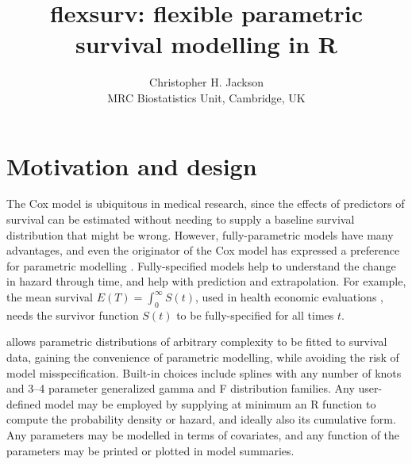 \documentclass[nojss,nofooter]{jss}\usepackage[]{graphicx}\usepackage[]{color}
\author{Christopher H. Jackson \\ MRC Biostatistics Unit, Cambridge, UK \\ \email{chris.jackson@mrc-bsu.cam.ac.uk}}
\title{flexsurv: flexible parametric survival modelling in R}
\begin{document}
\section{Motivation and design}

The Cox model is ubiquitous in medical research, since the effects of
predictors of survival can be estimated without needing to supply a
baseline survival distribution that might be wrong.  However,
fully-parametric models have many advantages, and even the originator
of the Cox model has expressed a preference for parametric modelling
\citep{reid:cox:conversation}.  Fully-specified models help to
understand the change in hazard through time, and help with prediction
and extrapolation. For example, the mean survival $E(T) =
\int_0^{\infty}S(t)$, used in health economic
evaluations \citep{latimer2013survival}, needs the survivor function
$S(t)$ to be fully-specified for all times $t$.


 allows parametric distributions of
arbitrary complexity to be fitted to survival data, gaining the
convenience of parametric modelling, while avoiding the risk of model
misspecification.  Built-in choices include splines with any number of
knots \citep{royston:parmar} and 3--4 parameter generalized gamma and
F distribution families.  Any user-defined model may be employed by
supplying at minimum an R function to compute the probability density
or hazard, and ideally also its cumulative form.  Any parameters may
be modelled in terms of covariates, and any function of the parameters
may be printed or plotted in model summaries.
\end{document}
